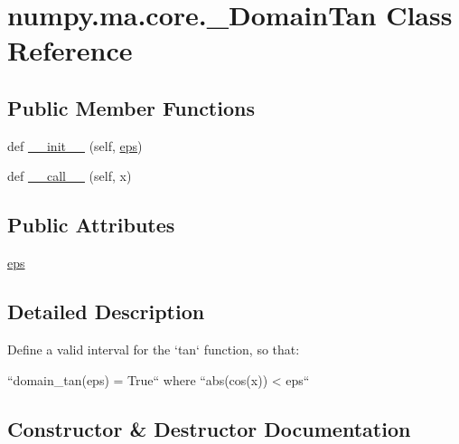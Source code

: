 \hypertarget{classnumpy_1_1ma_1_1core_1_1__DomainTan}{}\section{numpy.\+ma.\+core.\+\_\+\+Domain\+Tan Class Reference}
\label{classnumpy_1_1ma_1_1core_1_1__DomainTan}
\subsection*{Public Member Functions}
\begin{DoxyCompactItemize}
\item 
def \hyperlink{classnumpy_1_1ma_1_1core_1_1__DomainTan_a66b858247611251767d9aafc72c5455d}{\+\_\+\+\_\+init\+\_\+\+\_\+} (self, \hyperlink{classnumpy_1_1ma_1_1core_1_1__DomainTan_a5814fdcee90bcb3aa65ec5154acb8234}{eps})
\item 
def \hyperlink{classnumpy_1_1ma_1_1core_1_1__DomainTan_a29fced6f16fe967467f209bd1fd14a04}{\+\_\+\+\_\+call\+\_\+\+\_\+} (self, x)
\end{DoxyCompactItemize}
\subsection*{Public Attributes}
\begin{DoxyCompactItemize}
\item 
\hyperlink{classnumpy_1_1ma_1_1core_1_1__DomainTan_a5814fdcee90bcb3aa65ec5154acb8234}{eps}
\end{DoxyCompactItemize}


\subsection{Detailed Description}
\begin{DoxyVerb}Define a valid interval for the `tan` function, so that:

``domain_tan(eps) = True`` where ``abs(cos(x)) < eps``\end{DoxyVerb}
 

\subsection{Constructor \& Destructor Documentation}
\mbox{\label{classnumpy_1_1ma_1_1core_1_1__DomainTan_a66b858247611251767d9aafc72c5455d}} 

